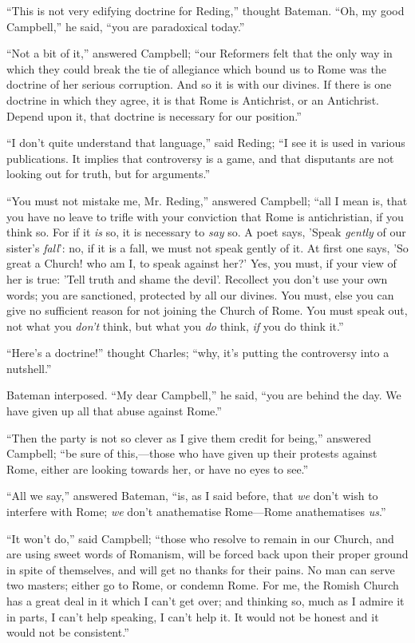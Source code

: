 ``This is not very edifying doctrine for Reding,'' thought
Bateman. ``Oh, my good Campbell,'' he said, ``you are
paradoxical today.''

``Not a bit of it,'' answered Campbell; ``our Reformers
felt that the only way in which they could break the tie of allegiance
which bound us to Rome was the doctrine of her serious corruption. And
so it is with our divines. If there is one doctrine in which they
agree, it is that Rome is Antichrist, or an Antichrist. Depend upon
it, that doctrine is necessary for our position.''

``I don't quite understand that language,'' said Reding;
``I see it is used in various publications. It implies that
controversy is a game, and that disputants are not looking out for
truth, but for arguments.''

``You must not mistake me, Mr. Reding,'' answered Campbell;
``all I mean is, that you have no leave to trifle with your
conviction that Rome is antichristian, if you think so. For if it \emph{is}
so, it is necessary to \emph{say} so. A poet says, 'Speak \emph{gently}
of our sister's \emph{fall}': no, if it is a fall, we must not speak
gently of it. At first one says, 'So great a Church! who am I, to
speak against her?' Yes, you must, if your view of her is true: 'Tell
truth and shame the devil'. Recollect you don't use your own words;
you are sanctioned, protected by all our divines. You must, else
you can give no sufficient reason for not joining the Church of Rome.
You must speak out, not what you \emph{don't} think, but what you \emph{do}
think, \emph{if} you do think it.''

``Here's a doctrine!'' thought Charles; ``why, it's
putting the controversy into a nutshell.''

Bateman interposed. ``My dear Campbell,'' he said,
``you are behind the day. We have given up all that abuse against
Rome.''

``Then the party is not so clever as I give them credit for
being,'' answered Campbell; ``be sure of this,—those who
have given up their protests against Rome, either are looking towards
her, or have no eyes to see.''

``All we say,'' answered Bateman, ``is, as I said
before, that \emph{we} don't wish to interfere with Rome; \emph{we}
don't anathematise Rome—Rome anathematises \emph{us}.''

``It won't do,'' said Campbell; ``those who resolve to
remain in our Church, and are using sweet words of Romanism, will be
forced back upon their proper ground in spite of themselves, and will
get no thanks for their pains. No man can serve two masters; either go
to Rome, or condemn Rome. For me, the Romish Church has a great deal
in it which I can't get over; and thinking so, much as I admire it in
parts, I can't help speaking, I can't help it. It would not be honest
and it would not be consistent.''

